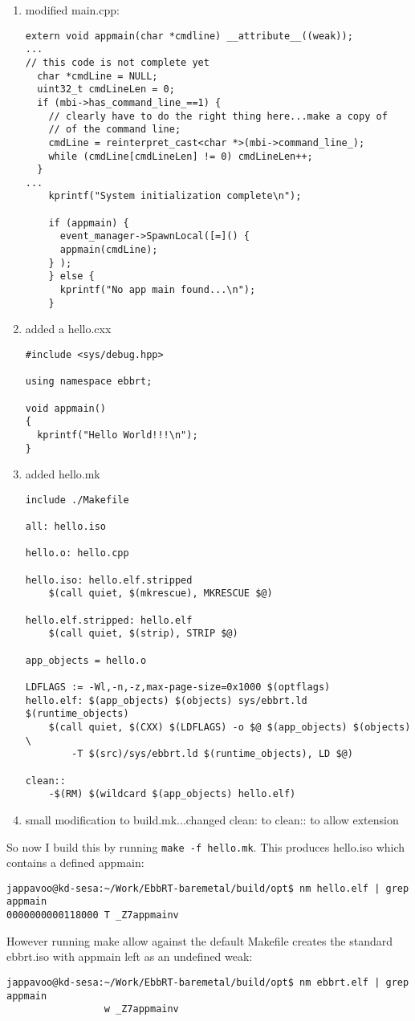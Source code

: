 \documentclass[11pt]{report}
\begin{document}
\begin{enumerate}
\item modified main.cpp:
\begin{verbatim}
extern void appmain(char *cmdline) __attribute__((weak));
...
// this code is not complete yet
  char *cmdLine = NULL;
  uint32_t cmdLineLen = 0;
  if (mbi->has_command_line_==1) {
    // clearly have to do the right thing here...make a copy of
    // of the command line;
    cmdLine = reinterpret_cast<char *>(mbi->command_line_);
    while (cmdLine[cmdLineLen] != 0) cmdLineLen++;
  }
...
    kprintf("System initialization complete\n");

    if (appmain) {
      event_manager->SpawnLocal([=]() {
	  appmain(cmdLine);
	} );
    } else {
      kprintf("No app main found...\n");
    }
\end{verbatim}
\item added a hello.cxx
\begin{verbatim}
#include <sys/debug.hpp>

using namespace ebbrt;

void appmain()
{
  kprintf("Hello World!!!\n"); 
}
\end{verbatim}
\item added hello.mk
\begin{verbatim}
include ./Makefile

all: hello.iso

hello.o: hello.cpp

hello.iso: hello.elf.stripped
	$(call quiet, $(mkrescue), MKRESCUE $@)

hello.elf.stripped: hello.elf
	$(call quiet, $(strip), STRIP $@)

app_objects = hello.o

LDFLAGS := -Wl,-n,-z,max-page-size=0x1000 $(optflags)
hello.elf: $(app_objects) $(objects) sys/ebbrt.ld $(runtime_objects)
	$(call quiet, $(CXX) $(LDFLAGS) -o $@ $(app_objects) $(objects) \
		-T $(src)/sys/ebbrt.ld $(runtime_objects), LD $@)

clean::
	-$(RM) $(wildcard $(app_objects) hello.elf)
\end{verbatim}
\item small modification to build.mk...changed clean: to clean:: to allow extension
\end{enumerate}

So now I build this by running {\tt make -f hello.mk}. This produces hello.iso
which contains a defined appmain:
\begin{verbatim}
jappavoo@kd-sesa:~/Work/EbbRT-baremetal/build/opt$ nm hello.elf | grep appmain
0000000000118000 T _Z7appmainv
\end{verbatim}
However running make allow against the default Makefile creates the standard ebbrt.iso with appmain left as an undefined weak:
\begin{verbatim}
jappavoo@kd-sesa:~/Work/EbbRT-baremetal/build/opt$ nm ebbrt.elf | grep appmain
                 w _Z7appmainv
\end{verbatim}
\end{document}
